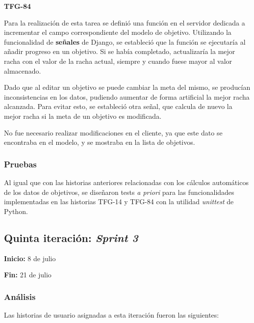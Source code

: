 \documentclass[10pt, a4paper]{aqademic}
\begin{document}
\medskip

\textbf{TFG-84}

Para la realización de esta tarea se definió una función en el servidor dedicada a incrementar el campo correspondiente del modelo de objetivo. Utilizando la funcionalidad de \textbf{señales} \cite{noauthor_signals_nodate} de Django, se estableció que la función se ejecutaría al añadir progreso en un objetivo. Si se había completado, actualizaría la mejor racha con el valor de la racha actual, siempre y cuando fuese mayor al valor almacenado.

Dado que al editar un objetivo se puede cambiar la meta del mismo, se producían inconsistencias en los datos, pudiendo aumentar de forma artificial la mejor racha alcanzada. Para evitar esto, se estableció otra señal, que calcula de nuevo la mejor racha si la meta de un objetivo es modificada.

No fue necesario realizar modificaciones en el cliente, ya que este dato se encontraba en el modelo, y se mostraba en la lista de objetivos.

\medskip

\subsubsection{Pruebas}

Al igual que con las historias anteriores relacionadas con los cálculos automáticos de los datos de objetivos, se diseñaron tests \textit{a priori} para las funcionalidades implementadas en las historias TFG-14 y TFG-84 con la utilidad \textit{unittest} de Python.


\subsection{Quinta iteración: \textit{Sprint 3}}

\textbf{Inicio:} 8 de julio

\textbf{Fin:} 21 de julio

\subsubsection{Análisis}

Las historias de usuario asignadas a esta iteración fueron las siguientes:
\end{document}
